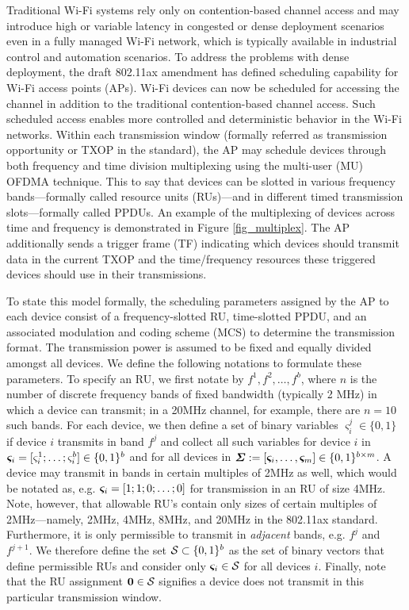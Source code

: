 Traditional Wi-Fi systems rely only on contention-based channel access and may introduce high or variable latency in congested or dense deployment scenarios even in a fully managed Wi-Fi network, which is typically available in industrial control and automation scenarios. To address the problems with dense deployment, the draft 802.11ax amendment has defined scheduling capability for Wi-Fi access points (APs). Wi-Fi devices can now be scheduled for accessing the channel in addition to the traditional contention-based channel access. Such scheduled access enables more controlled and deterministic behavior in the Wi-Fi networks. Within each transmission window (formally referred as transmission opportunity or TXOP in the standard), the AP may schedule devices through both frequency and time division multiplexing using the multi-user (MU) OFDMA technique. This to say that devices can be slotted in various frequency bands---formally called resource units (RUs)---and in different timed transmission slots---formally called PPDUs. An example of the multiplexing of devices across time and frequency is demonstrated in Figure \ref{fig_multiplex}. The AP additionally sends a trigger frame (TF) indicating which devices should transmit data in the current TXOP and the time/frequency resources these triggered devices should use in their transmissions. 

To state this model formally, the scheduling parameters assigned by the AP to each device consist of a frequency-slotted RU, time-slotted PPDU, and an associated modulation and coding scheme (MCS) to determine the transmission format. The transmission power is assumed to be fixed and equally divided amongst all devices. We define the following notations to formulate these parameters.  To specify an RU, we first notate by $f^1, f^2, \hdots, f^b$, where $n$ is the number of discrete frequency bands of fixed bandwidth (typically 2 MHz) in which a device can transmit; in a 20MHz channel, for example, there are $n=10$ such bands. For each device, we then define a set of binary variables $\varsigma^j_{i} \in \{0,1\}$ if device $i$ transmits in band $f^j$ and collect all such variables for device $i$ in $\boldsymbol{\varsigma}_i = [\varsigma^1_{i};\hdots;\varsigma^b_{i}] \in \{0,1\}^{b}$ and for all devices in  $\boldsymbol{\Sigma} := [\boldsymbol{\varsigma}_i, \hdots, \boldsymbol{\varsigma}_m] \in \{0,1\}^{b \times m}$. A device may transmit in bands in certain multiples of 2MHz as well, which would be notated as, e.g. $\boldsymbol{\varsigma}_i = [1; 1; 0; \hdots; 0]$ for transmission in an RU of size 4MHz. Note, however, that allowable RU's contain only sizes of certain multiples of 2MHz---namely, 2MHz, 4MHz, 8MHz, and 20MHz in the 802.11ax standard. Furthermore, it is only permissible to transmit in \emph{adjacent} bands, e.g. $f^{j}$ and $f^{j+1}$. We therefore define the set ${\mathcal S} \subset \{0,1\}^{b}$ as the set of binary vectors that define permissible RUs and consider only $\boldsymbol{\varsigma}_i \in {\ensuremath{\mathcal S}}$ for all devices $i$.  Finally, note that the RU assignment $\bb0 \in \ccalS$ signifies a device does not transmit in this particular transmission window.

